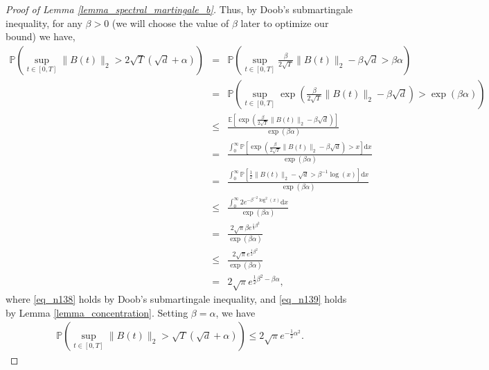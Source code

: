 \documentclass[11pt,letterpaper]{article}
\begin{document}
\begin{proof}[Proof of Lemma \ref{lemma_spectral_martingale_b}]
%
Thus, by Doob's submartingale inequality, for any $\beta>0$  (we will choose the value of $\beta$ later to optimize our bound) we have,
%
\begin{eqnarray}
    \mathbb{P}\left(\sup_{t \in [0,T]}\|B(t)\|_2 > 2\sqrt{T}(\sqrt{d} + \alpha)\right) & = &     \mathbb{P}\left(\sup_{t \in [0,T]}\frac{\beta}{2\sqrt{T}}\|B(t)\|_2 - \beta\sqrt{d} > \beta \alpha\right) \nonumber \\
    &= &\mathbb{P}\left(\sup_{t \in [0,T]}\exp\left(\frac{\beta}{2\sqrt{T}}\|B(t)\|_2 - \beta\sqrt{d}\right) > \exp(\beta \alpha)\right) \nonumber\\
    & \leq & \frac{\mathbb{E}[\exp(\frac{\beta}{2\sqrt{T}}\|B(t)\|_2 - \beta\sqrt{d})]}{\exp(\beta\alpha)}  \label{eq_n138}\\
        & = & \frac{\int_{0}^{\infty} \mathbb{P}[\exp(\frac{\beta}{2\sqrt{T}}\|B(t)\|_2 - \beta\sqrt{d})>x] \mathrm{d}x}{\exp(\beta \alpha)} \nonumber\\
                & = & \frac{\int_{0}^{\infty} \mathbb{P}[\frac{1}{2}\|B(t)\|_2 - \sqrt{d}> \beta^{-1} \log(x)] \mathrm{d}x}{\exp(\beta \alpha)} \nonumber\\
                & \leq & \frac{\int_{0}^{\infty} 2 e^{-\beta^{-2}\log^2(x)} \mathrm{d}x}{\exp(\beta \alpha)} \label{eq_n139}\\
                                                                                               & = & \frac{2\sqrt{\pi} \beta e^{\frac{1}{4}\beta^2}}{\exp(\beta \alpha)} \nonumber\\
                                                                & \leq   &\frac{2\sqrt{\pi}e^{\frac{1}{2}\beta^2}}{\exp(\beta \alpha)} \nonumber\\
                &= & 2\sqrt{\pi} e^{\frac{1}{2}\beta^2 - \beta \alpha}, \nonumber
%
\end{eqnarray}
%
where \eqref{eq_n138} holds by Doob's submartingale inequality, and \eqref{eq_n139} holds by Lemma \ref{lemma_concentration}.
%
%
%
%
Setting $\beta = \alpha$, we have
\begin{eqnarray*}
    \textstyle \mathbb{P}\left(\sup_{t \in [0,T]}\|B(t)\|_2 > \sqrt{T}(\sqrt{d} + \alpha)\right) \leq 2\sqrt{\pi} e^{-\frac{1}{2}\alpha^2}.
    \end{eqnarray*}
\end{proof}
\end{document}
